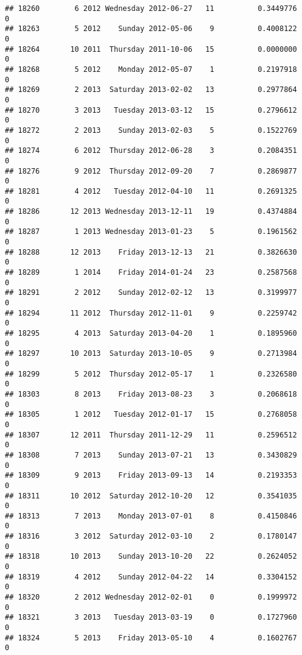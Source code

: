 \documentclass[
]{article}
\begin{document}
\begin{verbatim}
## 18260        6 2012 Wednesday 2012-06-27   11          0.3449776             0
## 18263        5 2012    Sunday 2012-05-06    9          0.4008122             0
## 18264       10 2011  Thursday 2011-10-06   15          0.0000000             0
## 18268        5 2012    Monday 2012-05-07    1          0.2197918             0
## 18269        2 2013  Saturday 2013-02-02   13          0.2977864             0
## 18270        3 2013   Tuesday 2013-03-12   15          0.2796612             0
## 18272        2 2013    Sunday 2013-02-03    5          0.1522769             0
## 18274        6 2012  Thursday 2012-06-28    3          0.2084351             0
## 18276        9 2012  Thursday 2012-09-20    7          0.2869877             0
## 18281        4 2012   Tuesday 2012-04-10   11          0.2691325             0
## 18286       12 2013 Wednesday 2013-12-11   19          0.4374884             0
## 18287        1 2013 Wednesday 2013-01-23    5          0.1961562             0
## 18288       12 2013    Friday 2013-12-13   21          0.3826630             0
## 18289        1 2014    Friday 2014-01-24   23          0.2587568             0
## 18291        2 2012    Sunday 2012-02-12   13          0.3199977             0
## 18294       11 2012  Thursday 2012-11-01    9          0.2259742             0
## 18295        4 2013  Saturday 2013-04-20    1          0.1895960             0
## 18297       10 2013  Saturday 2013-10-05    9          0.2713984             0
## 18299        5 2012  Thursday 2012-05-17    1          0.2326580             0
## 18303        8 2013    Friday 2013-08-23    3          0.2068618             0
## 18305        1 2012   Tuesday 2012-01-17   15          0.2768058             0
## 18307       12 2011  Thursday 2011-12-29   11          0.2596512             0
## 18308        7 2013    Sunday 2013-07-21   13          0.3430829             0
## 18309        9 2013    Friday 2013-09-13   14          0.2193353             0
## 18311       10 2012  Saturday 2012-10-20   12          0.3541035             0
## 18313        7 2013    Monday 2013-07-01    8          0.4150846             0
## 18316        3 2012  Saturday 2012-03-10    2          0.1780147             0
## 18318       10 2013    Sunday 2013-10-20   22          0.2624052             0
## 18319        4 2012    Sunday 2012-04-22   14          0.3304152             0
## 18320        2 2012 Wednesday 2012-02-01    0          0.1999972             0
## 18321        3 2013   Tuesday 2013-03-19    0          0.1727960             0
## 18324        5 2013    Friday 2013-05-10    4          0.1602767             0

\end{verbatim}
\end{document}
